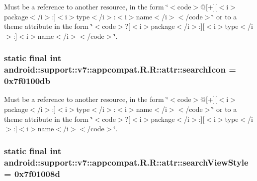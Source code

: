 Must be a reference to another resource, in the form \char`\"{}$<$code$>$@\mbox{[}+\mbox{]}\mbox{[}$<$i$>$package$<$/i$>$:\mbox{]}$<$i$>$type$<$/i$>$:$<$i$>$name$<$/i$>$$<$/code$>$\char`\"{} or to a theme attribute in the form \char`\"{}$<$code$>$?\mbox{[}$<$i$>$package$<$/i$>$:\mbox{]}\mbox{[}$<$i$>$type$<$/i$>$:\mbox{]}$<$i$>$name$<$/i$>$$<$/code$>$\char`\"{}. \hypertarget{classandroid_1_1support_1_1v7_1_1appcompat_1_1_r_1_1attr_3e68a57acbf99b341f0b00b2aef9235b}{
\subsubsection[{searchIcon}]{\setlength{\rightskip}{0pt plus 5cm}static final int android::support::v7::appcompat.R.R::attr::searchIcon = 0x7f0100db}}
\label{classandroid_1_1support_1_1v7_1_1appcompat_1_1_r_1_1attr_3e68a57acbf99b341f0b00b2aef9235b}


Must be a reference to another resource, in the form \char`\"{}$<$code$>$@\mbox{[}+\mbox{]}\mbox{[}$<$i$>$package$<$/i$>$:\mbox{]}$<$i$>$type$<$/i$>$:$<$i$>$name$<$/i$>$$<$/code$>$\char`\"{} or to a theme attribute in the form \char`\"{}$<$code$>$?\mbox{[}$<$i$>$package$<$/i$>$:\mbox{]}\mbox{[}$<$i$>$type$<$/i$>$:\mbox{]}$<$i$>$name$<$/i$>$$<$/code$>$\char`\"{}. \hypertarget{classandroid_1_1support_1_1v7_1_1appcompat_1_1_r_1_1attr_5977d2d4588d5ad06c319125fb65a3fb}{
\subsubsection[{searchViewStyle}]{\setlength{\rightskip}{0pt plus 5cm}static final int android::support::v7::appcompat.R.R::attr::searchViewStyle = 0x7f01008d}}
\label{classandroid_1_1support_1_1v7_1_1appcompat_1_1_r_1_1attr_5977d2d4588d5ad06c319125fb65a3fb}


